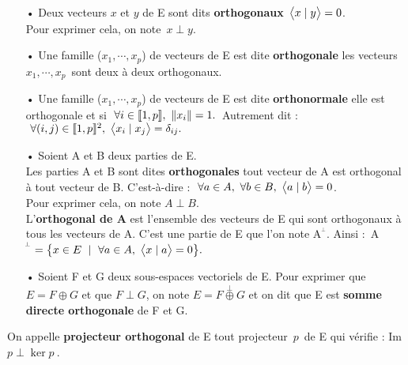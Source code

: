 \begin{itemize}[leftmargin=1cm]
    \item[•] Deux vecteurs $x$ et $y$ de E sont dits \textbf{orthogonaux} \ssi \(\,\bigl\langle x\mid y \bigr\rangle=0\).\\
    Pour exprimer cela, on note \(\,x\perp y\).\vspace{0.2cm}

    \item[•] Une famille (\(x_1,\cdots,x_p\)) de vecteurs de E est dite \textbf{orthogonale} \ssi les vecteurs \(x_1,\cdots,x_p\,\) sont deux à deux orthogonaux.\vspace{0.2cm}

    \item[•] Une famille (\(x_1,\cdots,x_p\)) de vecteurs de E est dite \textbf{orthonormale} \ssi elle est orthogonale et si \(\ \forall i\in \llbracket1,p\rrbracket,\ \left\lVert x_i\right\rVert=1.\,\) Autrement dit : \(\ \forall (i,j)\in \llbracket 1,p\rrbracket^2,\ \psm{x_i}{x_j}=\delta_{ij}.\)\vspace{0.2cm}

    \item[•] Soient A et B deux parties de E.\\
    Les parties A et B sont dites \textbf{orthogonales} \ssi tout vecteur de A est orthogonal à tout vecteur de B. C'est-à-dire \ssi : \(\ \forall a\in A,\ \forall b\in B,\ \psm{a}{b}=0 \).\\
    Pour exprimer cela, on note \(A\perp B\).\vspace{0.15cm}\\
    L'\textbf{orthogonal de A} est l'ensemble des vecteurs de E qui sont orthogonaux à tous les vecteurs de A. C'est une partie de E que l'on note A\(\!^{^\perp}\). Ainsi : \,A\(\!^{^\perp}  =\bigl\{x\in E \ \mid \ \forall a\in A,\ \bigl\langle x\mid a \bigr\rangle=0 \bigr\}. \)\vspace{0.3cm}

    \item[•] Soient F et G deux sous-espaces vectoriels de E. Pour exprimer que \(E=F\oplus G\) et que \(F\perp G\), on note \(E=F\overset{\perp}{\oplus}G \) et on dit que E est \textbf{somme directe orthogonale} de F et G.
\end{itemize}

\vspace{1cm}

\noindent On appelle \textbf{projecteur orthogonal} de E tout projecteur \(\,p\,\) de E qui vérifie : Im \(\! p \perp \ker p\ \).

